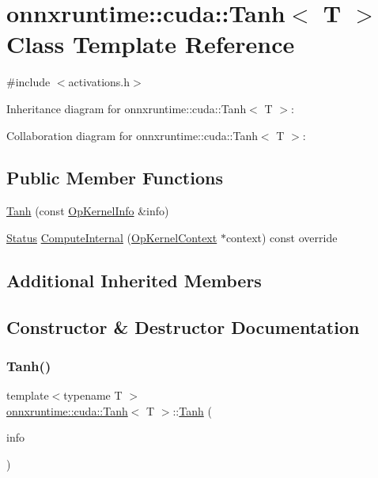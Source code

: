 \hypertarget{classonnxruntime_1_1cuda_1_1Tanh}{}\section{onnxruntime\+:\+:cuda\+:\+:Tanh$<$ T $>$ Class Template Reference}
\label{classonnxruntime_1_1cuda_1_1Tanh}


{\ttfamily \#include $<$activations.\+h$>$}



Inheritance diagram for onnxruntime\+:\+:cuda\+:\+:Tanh$<$ T $>$\+:


Collaboration diagram for onnxruntime\+:\+:cuda\+:\+:Tanh$<$ T $>$\+:
\subsection*{Public Member Functions}
\begin{DoxyCompactItemize}
\item 
\mbox{\hyperlink{classonnxruntime_1_1cuda_1_1Tanh_a6bef2b7788c2c6285c94cbbde3af836c}{Tanh}} (const \mbox{\hyperlink{classonnxruntime_1_1OpKernelInfo}{Op\+Kernel\+Info}} \&info)
\item 
\mbox{\hyperlink{classonnxruntime_1_1common_1_1Status}{Status}} \mbox{\hyperlink{classonnxruntime_1_1cuda_1_1Tanh_a7e741dd0d0ef94247a60a3d66db5857f}{Compute\+Internal}} (\mbox{\hyperlink{classonnxruntime_1_1OpKernelContext}{Op\+Kernel\+Context}} $\ast$context) const override
\end{DoxyCompactItemize}
\subsection*{Additional Inherited Members}


\subsection{Constructor \& Destructor Documentation}
\mbox{\label{classonnxruntime_1_1cuda_1_1Tanh_a6bef2b7788c2c6285c94cbbde3af836c}} 
\subsubsection{\texorpdfstring{Tanh()}{Tanh()}}
{\footnotesize\ttfamily template$<$typename T $>$ \\
\mbox{\hyperlink{classonnxruntime_1_1cuda_1_1Tanh}{onnxruntime\+::cuda\+::\+Tanh}}$<$ T $>$\+::\mbox{\hyperlink{classonnxruntime_1_1cuda_1_1Tanh}{Tanh}} (\begin{DoxyParamCaption}\item[{const \mbox{\hyperlink{classonnxruntime_1_1OpKernelInfo}{Op\+Kernel\+Info}} \&}]{info }\end{DoxyParamCaption})\hspace{0.3cm}{\ttfamily [inline]}}



